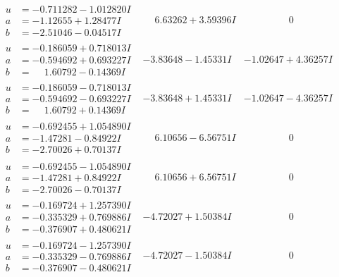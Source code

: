 \documentclass[1p]{elsarticle_modified}
\theoremstyle{definition}
\begin{document}
$$\begin{array}{c|c|c}
\begin{aligned}
u &= -0.711282 - 1.012820 I \\
a &= -1.12655 + 1.28477 I \\
b &= -2.51046 - 0.04517 I\end{aligned}
 & \phantom{-}6.63262 + 3.59396 I & \phantom{-0.000000 } 0 \\ \hline\begin{aligned}
u &= -0.186059 + 0.718013 I \\
a &= -0.594692 + 0.693227 I \\
b &= \phantom{-}1.60792 - 0.14369 I\end{aligned}
 & -3.83648 - 1.45331 I & -1.02647 + 4.36257 I \\ \hline\begin{aligned}
u &= -0.186059 - 0.718013 I \\
a &= -0.594692 - 0.693227 I \\
b &= \phantom{-}1.60792 + 0.14369 I\end{aligned}
 & -3.83648 + 1.45331 I & -1.02647 - 4.36257 I \\ \hline\begin{aligned}
u &= -0.692455 + 1.054890 I \\
a &= -1.47281 - 0.84922 I \\
b &= -2.70026 + 0.70137 I\end{aligned}
 & \phantom{-}6.10656 - 6.56751 I & \phantom{-0.000000 } 0 \\ \hline\begin{aligned}
u &= -0.692455 - 1.054890 I \\
a &= -1.47281 + 0.84922 I \\
b &= -2.70026 - 0.70137 I\end{aligned}
 & \phantom{-}6.10656 + 6.56751 I & \phantom{-0.000000 } 0 \\ \hline\begin{aligned}
u &= -0.169724 + 1.257390 I \\
a &= -0.335329 + 0.769886 I \\
b &= -0.376907 + 0.480621 I\end{aligned}
 & -4.72027 + 1.50384 I & \phantom{-0.000000 } 0 \\ \hline\begin{aligned}
u &= -0.169724 - 1.257390 I \\
a &= -0.335329 - 0.769886 I \\
b &= -0.376907 - 0.480621 I\end{aligned}
 & -4.72027 - 1.50384 I & \phantom{-0.000000 } 0\\

\end{array}$$
\end{document}

